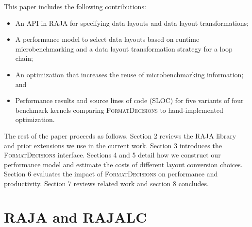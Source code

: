 \documentclass[sigconf,review=true]{acmart}
\newcommand{\FormatDecisions}[0]{{\textsc{FormatDecisions}}}
\begin{document}

This paper includes the following contributions:
\begin{itemize}
\item An API in RAJA for specifying data layouts and data layout transformations;
\item A performance model to select data layouts based on runtime microbenchmarking and a data layout transformation strategy for a loop chain;
\item An optimization that increases the reuse of microbenchmarking information; and
\item Performance results and source lines of code (SLOC) for five variants of four benchmark kernels comparing \FormatDecisions{} to hand-implemented optimization.
\end{itemize} 

The rest of the paper proceeds as follows. 
Section 2 reviews the RAJA library and prior extensions we use in the current work.
Section 3 introduces the \FormatDecisions{} interface.
Sections 4 and 5 detail how we construct our performance model and estimate the costs of different layout conversion choices.
Section 6 evaluates the impact of \FormatDecisions{}  on performance and productivity.
Section 7 reviews related work and section 8 concludes.


\section{RAJA and RAJALC}
\end{document}
